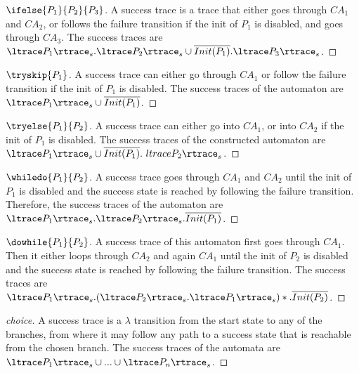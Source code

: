 \begin{proof}[$\ifelse{P_1}{P_2}{P_3}$]
A success trace is a trace that either goes through $CA_1$ and $CA_2$, or follows the failure transition if the init of $P_1$ is disabled, and goes through $CA_3$. The success traces are $ {\ltrace P_1 \rtrace}_s . {\ltrace P_2 \rtrace}_s \cup \overline{Init(P_1)} . {\ltrace P_3 \rtrace}_s$. 
\end{proof}

\begin{proof}[$\tryskip{P_1}$]
A success trace can either go through $CA_1$ or follow the failure transition if the init of $P_1$ is disabled. The success traces of the automaton are $ {\ltrace P_1 \rtrace}_s \cup \overline{Init(P_1)}$.
\end{proof}

\begin{proof}[$\tryelse{P_1}{P_2}$]
A success trace can either go into $CA_1$, or into $CA_2$ if the init of $P_1$ is disabled. The success traces of the constructed automaton are $ {\ltrace P_1 \rtrace}_s \cup \overline{Init(P_1)}.{\
ltrace P_2 \rtrace}_s$.
\end{proof}

\begin{proof}[$\whiledo{P_1}{P_2}$]
A success trace goes through $CA_1$ and $CA_2$ until the init of $P_1$ is disabled and the success state is reached by following the failure transition. Therefore, the success traces of the automaton are ${\ltrace P_1 \rtrace}_s . {\ltrace P_2 \rtrace}_s . \overline{Init(P_1)}$. 
\end{proof}

\begin{proof}[$\dowhile{P_1}{P_2}$]
A success trace of this automaton first goes through $CA_1$. Then it either loops through $CA_2$ and again $CA_1$ until the init of $P_2$ is disabled and the success state is reached by following the failure transition. The success traces are ${\ltrace P_1 \rtrace}_s . ({\ltrace P_2 \rtrace}_s . {\ltrace P_1 \rtrace}_s)* . \overline{Init(P_2)}$.
\end{proof}

\begin{proof}[choice]
A success trace is a $\lambda$ transition from the start state to any of the branches, from where it may follow any path to a success state that is reachable from the chosen branch. The success traces of the automata are $ {\ltrace P_1 \rtrace}_s \cup ... \cup {\ltrace P_n \rtrace}_s$.
\end{proof}

